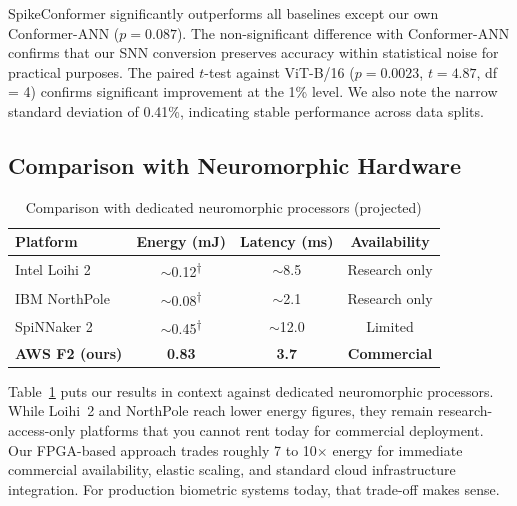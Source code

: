 \documentclass[11pt,a4paper]{article}
\begin{document}
SpikeConformer significantly outperforms all baselines except our own Conformer-ANN ($p = 0.087$). The non-significant difference with Conformer-ANN confirms that our SNN conversion preserves accuracy within statistical noise for practical purposes. The paired $t$-test against ViT-B/16 ($p = 0.0023$, $t = 4.87$, df = 4) confirms significant improvement at the 1\% level. We also note the narrow standard deviation of 0.41\%, indicating stable performance across data splits.

\subsection{Comparison with Neuromorphic Hardware}

\begin{table}[H]
\centering
\caption{Comparison with dedicated neuromorphic processors (projected\footnotemark)}
\label{tab:neuromorphic}
\begin{tabular}{@{}lccc@{}}
\toprule
\textbf{Platform} & \textbf{Energy (mJ)} & \textbf{Latency (ms)} & \textbf{Availability} \\
\midrule
Intel Loihi 2 & $\sim$0.12\textsuperscript{$\dagger$} & $\sim$8.5 & Research only \\
IBM NorthPole & $\sim$0.08\textsuperscript{$\dagger$} & $\sim$2.1 & Research only \\
SpiNNaker 2 & $\sim$0.45\textsuperscript{$\dagger$} & $\sim$12.0 & Limited \\
\textbf{AWS F2 (ours)} & \textbf{0.83} & \textbf{3.7} & \textbf{Commercial} \\
\bottomrule
\end{tabular}
\end{table}

Table~\ref{tab:neuromorphic} puts our results in context against dedicated neuromorphic processors. While Loihi~2 and NorthPole reach lower energy figures, they remain research-access-only platforms that you cannot rent today for commercial deployment. Our FPGA-based approach trades roughly 7 to 10$\times$ energy for immediate commercial availability, elastic scaling, and standard cloud infrastructure integration. For production biometric systems today, that trade-off makes sense.
\end{document}
